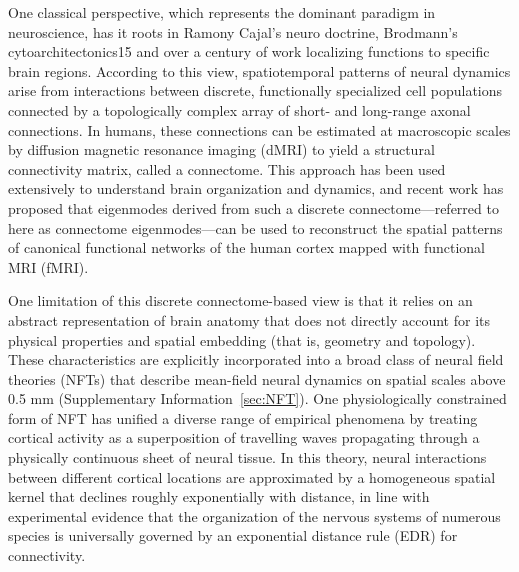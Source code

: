 \documentclass[sn-mathphys-num]{sn-jnl}%
\theoremstyle{thmstyleone}%
\theoremstyle{thmstyletwo}%
\theoremstyle{thmstylethree}%
\begin{document}
One classical perspective, which represents the dominant paradigm in neuroscience, has it roots in Ramony Cajal's neuro doctrine\cite{jones1999golgi}, Brodmann’s cytoarchitectonics15 and over a century of work localizing functions to specific brain regions\cite{broca1861remarques}. 
According to this view, spatiotemporal patterns of neural dynamics arise from interactions between discrete, functionally specialized cell populations connected by a topologically complex array of short- and long-range axonal connections\cite{bullmore2009complex,yuste2015neuron}. 
In humans, these connections can be estimated at macroscopic scales by diffusion magnetic resonance imaging (dMRI) to yield a structural connectivity matrix, called a connectome\cite{fornito2016fundamentals}. 
This approach has been used extensively to understand brain organization and dynamics\cite{bullmore2009complex,fornito2016fundamentals,breakspear2017dynamic}, and recent work has proposed that eigenmodes derived from such a discrete connectome—referred to here as connectome eigenmodes—can be used to reconstruct the spatial patterns of canonical functional networks of the human cortex mapped with functional MRI (fMRI)\cite{atasoy2016human,preti2019decoupling}.


One limitation of this discrete connectome-based view is that it relies on an abstract representation of brain anatomy that does not directly account for its physical properties and spatial embedding (that is, geometry and topology). 
These characteristics are explicitly incorporated into a broad class of neural field theories (NFTs)\cite{wright1995simulation,jirsa1996field,robinson1997propagation} that describe mean-field neural dynamics on spatial scales above 0.5 mm (Supplementary Information~\ref{sec:NFT}). 
One physiologically constrained form of NFT has unified a diverse range of empirical phenomena\cite{robinson1997propagation,robinson2005multiscale} by treating cortical activity as a superposition of travelling waves propagating through a physically continuous sheet of neural tissue. 
In this theory, neural interactions between different cortical locations are approximated by a homogeneous spatial kernel that declines roughly exponentially with distance\cite{robinson2019physical}, in line with experimental evidence that the organization of the nervous systems of numerous species is universally governed by an exponential distance rule (EDR) for connectivity\cite{braitenberg2013cortex,wang2016brain,roberts2017consistency}.
\end{document}
